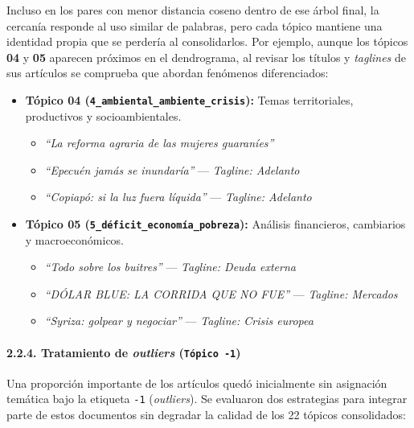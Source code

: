 \documentclass[
]{article}
\providecommand{\tightlist}{%
  \setlength{\itemsep}{0pt}\setlength{\parskip}{0pt}}
\begin{document}
Incluso en los pares con menor distancia coseno dentro de ese árbol
final, la cercanía responde al uso similar de palabras, pero cada tópico
mantiene una identidad propia que se perdería al consolidarlos. Por
ejemplo, aunque los tópicos \textbf{04} y \textbf{05} aparecen próximos
en el dendrograma, al revisar los títulos y \emph{taglines} de sus
artículos se comprueba que abordan fenómenos diferenciados:

\begin{itemize}
\tightlist
\item
  \textbf{Tópico 04 (\texttt{4\_ambiental\_ambiente\_crisis}):} Temas
  territoriales, productivos y socioambientales.

  \begin{itemize}
  \tightlist
  \item
    \emph{``La reforma agraria de las mujeres guaraníes''}
  \item
    \emph{``Epecuén jamás se inundaría''} --- \emph{Tagline: Adelanto}
  \item
    \emph{``Copiapó: si la luz fuera líquida''} --- \emph{Tagline:
    Adelanto}
  \end{itemize}
\item
  \textbf{Tópico 05 (\texttt{5\_déficit\_economía\_pobreza}):} Análisis
  financieros, cambiarios y macroeconómicos.

  \begin{itemize}
  \tightlist
  \item
    \emph{``Todo sobre los buitres''} --- \emph{Tagline: Deuda externa}
  \item
    \emph{``DÓLAR BLUE: LA CORRIDA QUE NO FUE''} --- \emph{Tagline:
    Mercados}
  \item
    \emph{``Syriza: golpear y negociar''} --- \emph{Tagline: Crisis
    europea}
  \end{itemize}
\end{itemize}

\paragraph{\texorpdfstring{2.2.4. Tratamiento de \emph{outliers}
(\texttt{Tópico\ -1})}{2.2.4. Tratamiento de outliers (Tópico -1)}}\label{tratamiento-de-outliers-tuxf3pico--1}

Una proporción importante de los artículos quedó inicialmente sin
asignación temática bajo la etiqueta \texttt{-1} (\emph{outliers}). Se
evaluaron dos estrategias para integrar parte de estos documentos sin
degradar la calidad de los 22 tópicos consolidados:
\end{document}

